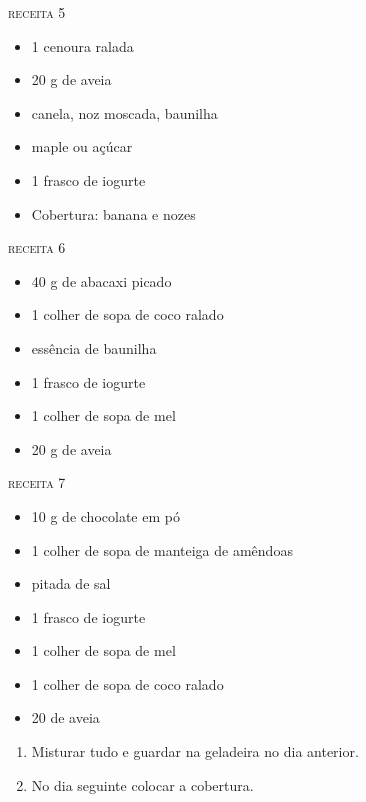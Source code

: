 {\begin{multicols}{2}
    \textsc{receita 5}
    \begin{itemize}
    \item 1 cenoura ralada
    \item 20 g de aveia
    \item canela, noz moscada, baunilha
    \item maple ou açúcar
    \item 1 frasco de iogurte
    \item Cobertura: banana e nozes
    \end{itemize}

    \textsc{receita 6}
    \begin{itemize}
    \item 40 g de abacaxi picado
    \item 1 colher de sopa de coco ralado
    \item essência de baunilha
    \item 1 frasco de iogurte
    \item 1 colher de sopa de mel
    \item 20 g de aveia
    \end{itemize}

    \textsc{receita 7}
    \begin{itemize}
    \item 10 g de chocolate em pó
    \item 1 colher de sopa de manteiga de amêndoas
    \item pitada de sal
    \item 1 frasco de iogurte
    \item 1 colher de sopa de mel
    \item 1 colher de sopa de coco ralado
    \item 20 de aveia
    \end{itemize}

\end{multicols}
} {\begin{enumerate}
  \item Misturar tudo e guardar na geladeira no dia anterior.
  \item No dia seguinte colocar a cobertura.
  \end{enumerate} }


